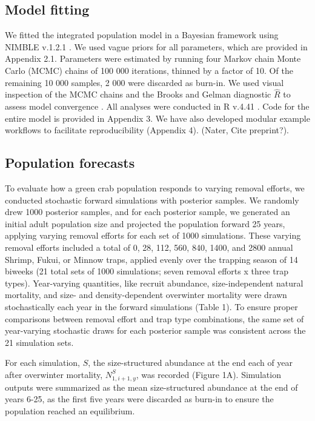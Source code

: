 \documentclass{article}
\begin{document}
\subsection{Model fitting}
We fitted the integrated population model in a Bayesian framework using NIMBLE v.1.2.1 \parencite{de2017programming}. We used vague priors for all parameters, which are provided in Appendix 2.1. Parameters were estimated by running four Markov chain Monte Carlo (MCMC) chains of 100 000 iterations, thinned by a factor of 10. Of the remaining 10 000 samples, 2 000 were discarded as burn-in. We used visual inspection of the MCMC chains and the Brooks and Gelman diagnostic $\hat{R}$ to assess model convergence \parencite{brooks1998general}. All analyses were conducted in R v.4.41 \parencite{Rcore}. Code for the entire model is provided in Appendix 3. We have also developed modular example workflows to facilitate reproducibility (Appendix 4). (Nater, Cite preprint?).


\subsection{Population forecasts}

To evaluate how a green crab population responds to varying removal efforts, we conducted stochastic forward simulations with posterior samples. We randomly drew 1000 posterior samples, and for each posterior sample, we generated an initial adult population size and projected the population forward 25 years, applying varying removal efforts for each set of 1000 simulations. These varying removal efforts included a total of 0, 28, 112, 560, 840, 1400, and 2800 annual Shrimp, Fukui, or Minnow traps, applied evenly over the trapping season of 14 biweeks (21 total sets of 1000 simulations; seven removal efforts x three trap types). Year-varying quantities, like recruit abundance, size-independent natural mortality, and size- and density-dependent overwinter mortality were drawn stochastically each year in the forward simulations (Table 1). To ensure proper comparisons between removal effort and trap type combinations, the same set of year-varying stochastic draws for each posterior sample was consistent across the 21 simulation sets. 

For each simulation, $S$, the size-structured abundance at the end each of year after overwinter mortality, $N^S_{1,i+1,y}$, was recorded (Figure 1A). Simulation outputs were summarized as the mean size-structured abundance at the end of years 6-25, as the first five years were discarded as burn-in to ensure the population reached an equilibrium.
\end{document}
